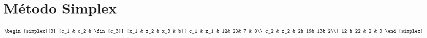 \chapter{Método Simplex}
$$\begin{simplex}{3}
{c_1 & c_2 & \fin{c_3}}
{x_1 & x_2 & x_3 & b}{
c_1 & z_1 & 12& 20& 7 & 0\\
c_2 & z_2 & 2& 19& 13& 2\\}
12 & 22 & 2 & 3
\end{simplex}$$